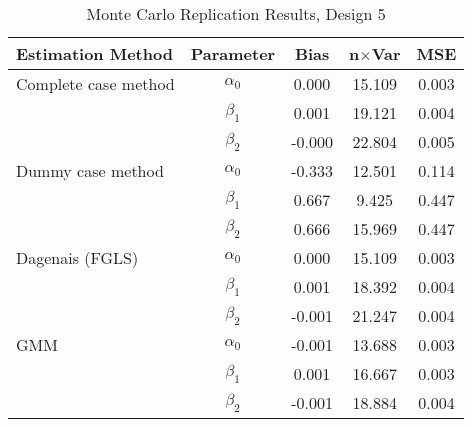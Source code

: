 \begin{table}
\centering
\caption{Monte Carlo Replication Results, Design 5}
\label{table:MCReplicationResultsDesign5}
\begin{tabular}{lcccc}
\toprule
Estimation Method & Parameter & Bias & n$\times$Var & MSE \\
\midrule
Complete case method & $\alpha_0$ & 0.000 & 15.109 & 0.003 \\
 & $\beta_1$ & 0.001 & 19.121 & 0.004 \\
 & $\beta_2$ & -0.000 & 22.804 & 0.005 \\
Dummy case method & $\alpha_0$ & -0.333 & 12.501 & 0.114 \\
 & $\beta_1$ & 0.667 & 9.425 & 0.447 \\
 & $\beta_2$ & 0.666 & 15.969 & 0.447 \\
Dagenais (FGLS) & $\alpha_0$ & 0.000 & 15.109 & 0.003 \\
 & $\beta_1$ & 0.001 & 18.392 & 0.004 \\
 & $\beta_2$ & -0.001 & 21.247 & 0.004 \\
GMM & $\alpha_0$ & -0.001 & 13.688 & 0.003 \\
 & $\beta_1$ & 0.001 & 16.667 & 0.003 \\
 & $\beta_2$ & -0.001 & 18.884 & 0.004 \\
\bottomrule
\end{tabular}
\end{table}
